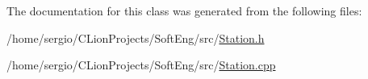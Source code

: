 The documentation for this class was generated from the following files\+:\begin{DoxyCompactItemize}
\item 
/home/sergio/\+C\+Lion\+Projects/\+Soft\+Eng/src/\hyperlink{_station_8h}{Station.\+h}\item 
/home/sergio/\+C\+Lion\+Projects/\+Soft\+Eng/src/\hyperlink{_station_8cpp}{Station.\+cpp}\end{DoxyCompactItemize}
